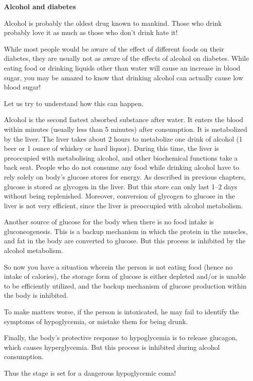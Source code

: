 \noindent\textbf{Alcohol and diabetes}

Alcohol is probably the oldest drug known to mankind. Those who drink probably love it as much as those who don’t drink hate it!

While most people would be aware of the effect of different foods on their diabetes, they are usually not as aware of the effects of alcohol on diabetes. While eating food or drinking liquids other than water will cause an increase in blood sugar, you may be amazed to know that drinking alcohol can actually cause low blood sugar!

Let us try to understand how this can happen.

Alcohol is the second fastest absorbed substance after water. It enters the blood within minutes (usually less than 5 minutes) after consumption. It is metabolized by the liver. The liver takes about 2 hours to metabolize one drink of alcohol (1 beer or 1 ounce of whiskey or hard liquor). During this time, the liver is preoccupied with metabolising alcohol, and other biochemical functions take a back seat. People who do not consume any food while drinking alcohol have to rely solely on body’s glucose stores for energy. As described in previous chapters, glucose is stored as glycogen in the liver. But this store can only last 1–2 days without being replenished. Moreover, conversion of glycogen to glucose in the liver is not very efficient, since the liver is preoccupied with alcohol metabolism.

Another source of glucose for the body when there is no food intake is gluconeogenesis. This is a backup mechanism in which the protein in the muscles, and fat in the body are converted to glucose. But this process is inhibited by the alcohol metabolism.

So now you have a situation wherein the person is not eating food (hence no intake of calories), the storage form of glucose is either depleted and/or is unable to be efficiently utilized, and the backup mechanism of glucose production within the body is inhibited.

To make matters worse, if the person is intoxicated, he may fail to identify the symptoms of hypoglycemia, or mistake them for being drunk.

Finally, the body’s protective response to hypoglycemia is to release glucagon, which causes hyperglycemia. But this process is inhibited during alcohol consumption.

Thus the stage is set for a dangerous hypoglycemic coma!

